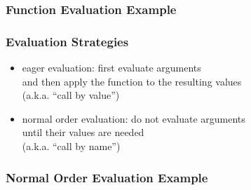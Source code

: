 \documentclass[dvipsnames]{beamer}
\theoremstyle{plain}
\begin{document}
\begin{frame}
  \frametitle{Function Evaluation Example}

  \begin{example}

    \pause
    \medskip

    \pause
    \medskip

    \pause
    \medskip

    \pause
    \medskip

    \pause
    \medskip

    \pause
    \medskip

    \pause
    \medskip
  \end{example}
\end{frame}

\begin{frame}
  \frametitle{Evaluation Strategies}

  \begin{itemize}
    \item \alert{eager evaluation}: first evaluate arguments\\
      and then apply the function to the resulting values\\
      (a.k.a. ``call by value'')

    \pause
    \medskip
    \item \alert{normal order evaluation}: do not evaluate arguments\\
      until their values are needed\\
      (a.k.a. ``call by name'')
  \end{itemize}
\end{frame}

\begin{frame}
  \frametitle{Normal Order Evaluation Example}

  \begin{example}

    \pause
    \medskip

    \pause
    \medskip

    \pause
    \medskip

    \pause
    \medskip

    \pause
    \medskip

    \pause
    \medskip

    \pause
    \medskip

    \pause
    \medskip
  \end{example}
\end{frame}
\end{document}
